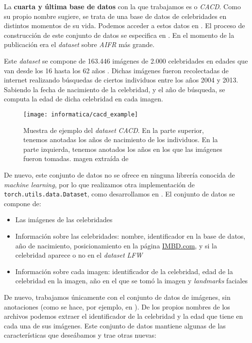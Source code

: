 La \textbf{cuarta y última base de datos} con la que trabajamos es  o \textit{CACD}. Como su propio nombre sugiere, se trata de una base de datos de celebridades en distintos momentos de su vida. Podemos acceder a estos datos en \cite{informatica:cacd_dataset}. El proceso de construcción de este conjunto de datos se especifica en \cite{informatica:paper_cacd}. En el momento de la publicación era el \textit{dataset} sobre \textit{AIFR} más grande.

Este \textit{dataset} se compone de 163.446 imágenes de 2.000 celebridades en edades que van desde los 16 hasta los 62 años \cite{informatica:paper_cacd}. Dichas imágenes fueron recolectadas de internet realizando búsquedas de ciertos individuos entre los años 2004 y 2013. Sabiendo la fecha de nacimiento de la celebridad, y el año de búsqueda, se computa la edad de dicha celebridad en cada imagen.

\begin{figure}[H]
    \centering
    \texttt{[image: informatica/cacd\_example]}
    \caption{Muestra de ejemplo del \textit{dataset} \textit{CACD}. En la parte superior, tenemos anotadas los años de nacimiento de los individuos. En la parte izquierda, tenemos anotados los años en los que las imágenes fueron tomadas. magen extraída de \cite{informatica:paper_cacd}}
    \label{img:cacd_imagenes_ejemplo}
\end{figure}

De nuevo, este conjunto de datos no se ofrece en ninguna librería conocida de \textit{machine learning}, por lo que realizamos otra implementación de \lstinline{torch.utils.data.Dataset}, como desarrollamos en . El conjunto de datos se compone de:

\begin{itemize}
    \item Las imágenes de las celebridades
    \item Información sobre las celebridades: nombre, identificador en la base de datos, año de nacimiento, posicionamiento en la página \url{IMBD.com}, y si la celebridad aparece o no en el \textit{dataset} \textit{LFW}
    \item Información sobre cada imagen: identificador de la celebridad, edad de la celebridad en la imagen, año en el que se tomó la imagen y \textit{landmarks} faciales
\end{itemize}

De nuevo, trabajamos únicamente con el conjunto de datos de imágenes, sin anotaciones (como se hace, por ejemplo, en \cite{informatica:facenet}). De los propios nombres de los archivos podemos extraer el identificador de la celebridad y la edad que tiene en cada una de sus imágenes. Este conjunto de datos mantiene algunas de las características que deseábamos y trae otras nuevas:

